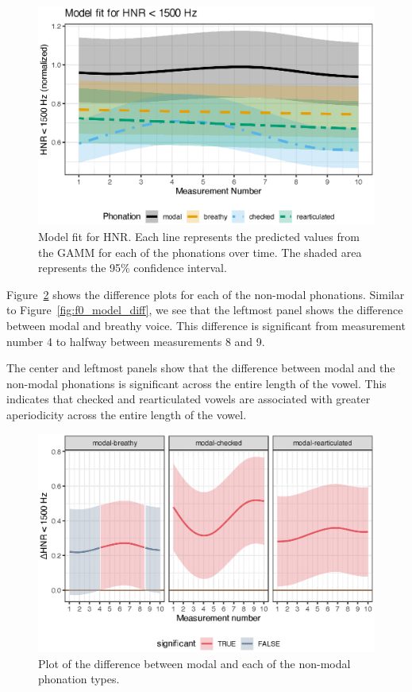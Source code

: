 \begin{figure}[h!]
    \centering
    \includegraphics[width = \linewidth]{images/LCH_GAMMs/hnr15_model_fit.eps}
    \caption{Model fit for HNR. Each line represents the predicted values from the GAMM for each of the phonations over time. The shaded area represents the 95\% confidence interval.}
    \label{fig:hnr_model_fit}
\end{figure}  

Figure~\ref{fig:hnr_model_diff} shows the difference plots for each of the non-modal phonations. Similar to Figure~\ref{fig:f0_model_diff}, we see that the leftmost panel shows the difference between modal and breathy voice. This difference is significant from measurement number 4 to halfway between measurements 8 and 9. 

The center and leftmost panels show that the difference between modal and the non-modal phonations is significant across the entire length of the vowel. This indicates that checked and rearticulated vowels are associated with greater aperiodicity across the entire length of the vowel.

\begin{figure}[h!]
    \centering
    \includegraphics[width = \linewidth]{images/LCH_GAMMs/hnr15_model_diff.eps}
    \caption{Plot of the difference between modal and each of the non-modal phonation types.}
    \label{fig:hnr_model_diff}
\end{figure}

